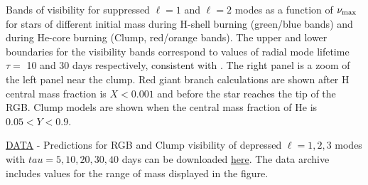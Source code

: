 \label{fig:visibility} Bands of visibility for suppressed $\ell=1$ and $\ell=2$ modes as a function of $\nu_{\rm max}$ for stars of different initial mass during H-shell burning (green/blue bands) and during He-core burning (Clump, red/orange bands). The upper and lower boundaries for the visibility bands correspond to values of radial mode lifetime $\tau=$ 10 and 30 days respectively, consistent with \citet{Dupret_2009,Corsaro_2015}. The right panel is a zoom of the left panel near the clump. Red giant branch calculations are shown after H central mass fraction is $ X < 0.001$ and before the star reaches the tip of the RGB. Clump models are shown when the central mass fraction of He is $0.05 < Y < 0.9$.

\href{https://www.authorea.com/users/2/articles/38219/master/file/figures/integral_stack1/Data.zip}{DATA} - Predictions for RGB and Clump visibility of depressed $\ell=1,2,3$ modes with $tau=5,10,20,30,40$ days can be downloaded \href{https://www.authorea.com/users/2/articles/38219/master/file/figures/integral_stack1/Data.zip}{here}. The data archive includes values for the range of mass displayed in the figure.


  
  
  